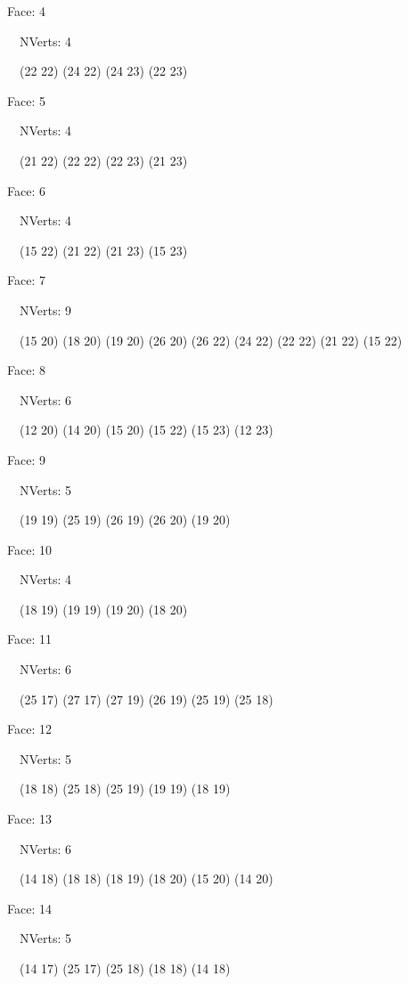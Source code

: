 \documentclass{article}
\begin{document}
{\footnotesize 

Face: 4

\   \    NVerts: 4

 \   \   (22 22) (24 22) (24 23) (22 23)}

{\footnotesize 

Face: 5

\   \    NVerts: 4

 \   \   (21 22) (22 22) (22 23) (21 23)}

{\footnotesize 

Face: 6

\   \    NVerts: 4

 \   \   (15 22) (21 22) (21 23) (15 23)}

{\footnotesize 

Face: 7

\   \    NVerts: 9

 \   \   (15 20) (18 20) (19 20) (26 20) (26 22) (24 22) (22 22) (21 22) (15 22)}

{\footnotesize 

Face: 8

\   \    NVerts: 6

 \   \   (12 20) (14 20) (15 20) (15 22) (15 23) (12 23)}

{\footnotesize 

Face: 9

\   \    NVerts: 5

 \   \   (19 19) (25 19) (26 19) (26 20) (19 20)}

{\footnotesize 

Face: 10

\   \    NVerts: 4

 \   \   (18 19) (19 19) (19 20) (18 20)}

{\footnotesize 

Face: 11

\   \    NVerts: 6

 \   \   (25 17) (27 17) (27 19) (26 19) (25 19) (25 18)}

{\footnotesize 

Face: 12

\   \    NVerts: 5

 \   \   (18 18) (25 18) (25 19) (19 19) (18 19)}

{\footnotesize 

Face: 13

\   \    NVerts: 6

 \   \   (14 18) (18 18) (18 19) (18 20) (15 20) (14 20)}

{\footnotesize 

Face: 14

\   \    NVerts: 5

 \   \   (14 17) (25 17) (25 18) (18 18) (14 18)}
\end{document}
